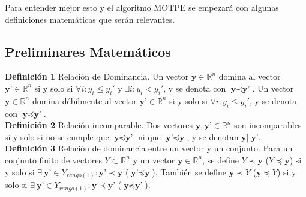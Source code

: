 Para entender mejor esto y el algoritmo MOTPE se empezará con algunas definiciones matemáticas que serán relevantes.

\subsection{Preliminares Matemáticos}

\noindent\textbf{Definición 1} Relación de Dominancia. Un vector $\textbf{y} \in \mathbb{R}^n$ domina al vector $\textbf{y'} \in \mathbb{R}^n$ si y solo si $\forall i: y_i \leq y_i'$ y $\exists i : y_i < y_i'$, y se denota con $\textbf{y} \prec \textbf{y'} $. Un vector $\textbf{y} \in \mathbb{R}^n$ domina débilmente al vector $\textbf{y'} \in \mathbb{R}^n$ si y solo si $\forall i: y_i \leq y_i'$, y se denota con $\textbf{y} \preceq \textbf{y'} $. \\


\noindent\textbf{Definición 2} Relación incomparable. Dos vectores $\textbf{y},\textbf{y'} \in \mathbb{R}^n$ son incomparables si y solo si no se cumple que $\textbf{y} \preceq \textbf{y'} $ ni que $\textbf{y'} \preceq \textbf{y} $, y se denotan $\textbf{y}||\textbf{y'}$.\\





\noindent\textbf{Definición 3} Relación de dominancia entre un vector y un conjunto. Para un conjunto finito de vectores $Y \subset \mathbb{R}^n$ y un vector $\textbf{y} \in \mathbb{R}^n$, se define $Y \prec \textbf{y}$ ($Y \preceq \textbf{y}$) si y solo si $\exists \ \textbf{y'} \in  Y_{rango(1)}:\textbf{y'} \prec \textbf{y}$ ($\textbf{y'} \preceq \textbf{y}$). También se define $\textbf{y} \prec Y$ ($\textbf{y} \preceq Y $) si y solo si $\exists \ \textbf{y'} \in  Y_{rango(1)}:\textbf{y} \prec \textbf{y'}$ ($\textbf{y} \preceq \textbf{y'}$).\\


